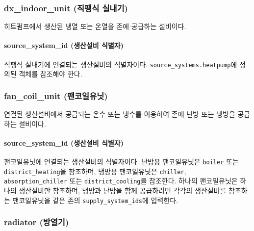 \subsubsection{dx\_indoor\_unit (직팽식 실내기)} \label{subsubsection:ioref:dxindoorunit}

히트펌프에서 생산된 냉열 또는 온열을
존에 공급하는 설비이다.


\paragraph{source\_system\_id (생산설비 식별자)} 직팽식 실내기에 연결되는 생산설비의 식별자이다. \texttt{source\_systems.heatpump}에 정의된 객체를
참조해야 한다.

\subsubsection{fan\_coil\_unit (팬코일유닛)} \label{subsubsection:ioref:fancoilunit}

연결된 생산설비에서 공급되는 온수 또는 냉수를 이용하여 존에 난방 또는 냉방을 공급하는 설비이다.


\paragraph{source\_system\_id (생산설비 식별자)} 팬코일유닛에 연결되는 생산설비의 식별자이다. 난방용 팬코일유닛은 \texttt{boiler} 또는 \texttt{district\_heating}을 참조하며, 냉방용 팬코일유닛은 \texttt{chiller}, \texttt{absorption\_chiller} 또는 \texttt{district\_cooling}을 참조한다. 하나의 팬코일유닛은 하나의 생산설비만 참조하며, 냉방과 난방을 함께 공급하려면 각각의 생산설비를 참조하는 팬코일유닛을 같은 존의 \texttt{supply\_system\_ids}에 입력한다.

\subsubsection{radiator (방열기)} \label{subsubsection:ioref:radiator}

